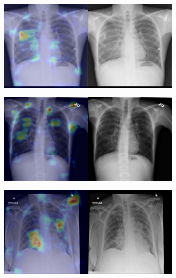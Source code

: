\begin{figure}[b]
\begin{subfigure}{0.4\textwidth}
    \end{subfigure}
    \begin{subfigure}{0.4\textwidth}
        \centering
        \includegraphics[width=1.0\textwidth]{Chapters/5. Conclusiones/img/Infiltration/1_1_00001006_017.png}
    \end{subfigure}
    \begin{subfigure}{0.4\textwidth}
        \centering
        \includegraphics[width=1.0\textwidth]{Chapters/5. Conclusiones/img/Infiltration/1_1_00001006_027.png}
    \end{subfigure}
    \begin{subfigure}{0.4\textwidth}
        \centering
        \includegraphics[width=1.0\textwidth]{Chapters/5. Conclusiones/img/Infiltration/1_1_00001075_005.png}

\end{subfigure}
\end{figure}
